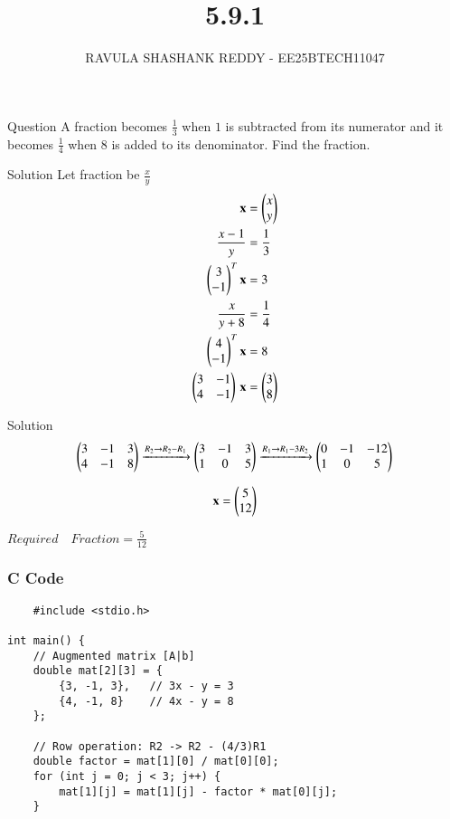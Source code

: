 \documentclass{beamer}
\title %
{5.9.1}
\author %
{RAVULA SHASHANK REDDY - EE25BTECH11047}
\begin{document}
	
	
	\frame{\titlepage}
	\begin{frame}{Question}
    A fraction becomes $\tfrac{1}{3}$ when $1$ is subtracted from its numerator and it becomes 
$\tfrac{1}{4}$ when $8$ is added to its denominator. Find the fraction.

\end{frame}
\begin{frame}{Solution}
    Let fraction be  $\tfrac{x}{y}$  
\begin{align}
\mathbf{x}&=\begin{pmatrix}x \\ y\end{pmatrix}\\
\frac{x-1}{y}&=\frac{1}{3}\\
\begin{pmatrix}3 \\ -1\end{pmatrix}^T\mathbf{x}&=3\\
\frac{x}{y+8}&=\frac{1}{4}\\
\begin{pmatrix}4 \\ -1\end{pmatrix}^T\mathbf{x}&=8\\
\begin{pmatrix}3 & -1 \\ 4 & -1\end{pmatrix}\,\mathbf{x} &= \begin{pmatrix}3 \\ 8\end{pmatrix}
\end{align}
\end{frame}
\begin{frame}{Solution}
\begin{align}
\begin{pmatrix}3 & -1 & 3 \\ 4 & -1 & 8\end{pmatrix}
\xrightarrow{R_2 \rightarrow{R_2-R_1}}
\begin{pmatrix}3 & -1 & 3 \\ 1 & 0 & 5\end{pmatrix}
\xrightarrow{R_1\rightarrow{R_1-3R_2}}
\begin{pmatrix}0 & -1 & -12 \\ 1 & 0 & 5\end{pmatrix}
\end{align}

\begin{align}
\mathbf{x}=\begin{pmatrix}5 \\ 12\end{pmatrix}
\end{align}
\begin{center}

$\boxed{Required\quad Fraction = \frac{5}{12}}$
\end{center}

\end{frame}
\begin{frame}[fragile]
\frametitle{C Code}
\begin{lstlisting}
    #include <stdio.h>

int main() {
    // Augmented matrix [A|b]
    double mat[2][3] = {
        {3, -1, 3},   // 3x - y = 3
        {4, -1, 8}    // 4x - y = 8
    };

    // Row operation: R2 -> R2 - (4/3)R1
    double factor = mat[1][0] / mat[0][0];
    for (int j = 0; j < 3; j++) {
        mat[1][j] = mat[1][j] - factor * mat[0][j];
    }
\end{lstlisting}  
\end{frame}
\end{document}

